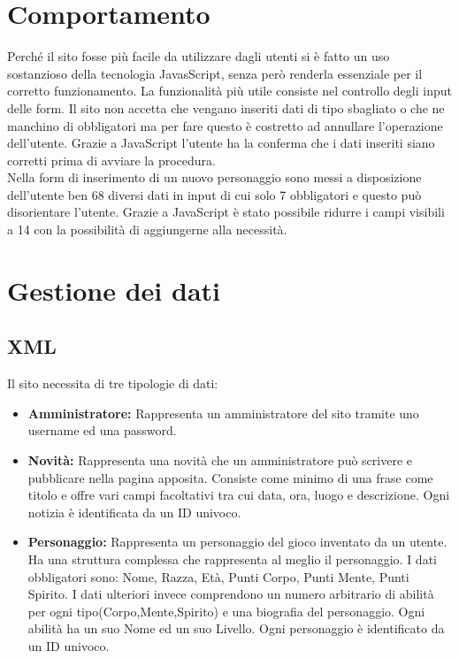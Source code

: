 \documentclass{article}
\begin{document}

\section{Comportamento}
	Perché il sito fosse più facile da utilizzare dagli utenti si è fatto un uso sostanzioso della tecnologia JavasScript, senza
	però renderla essenziale per il corretto funzionamento. La funzionalità più utile consiste nel controllo degli input delle 
	form. Il sito non accetta che vengano inseriti dati di tipo sbagliato o che ne manchino di obbligatori ma per fare questo è 
	costretto ad annullare l'operazione dell'utente. Grazie a JavaScript l'utente ha la conferma che i dati inseriti siano
	corretti prima di avviare la procedura. \\
	Nella form di inserimento di un nuovo personaggio sono messi a disposizione dell'utente ben 68 diversi dati in input di 
	cui solo 7 obbligatori e questo può disorientare l'utente. Grazie a JavaScript è stato possibile ridurre i campi visibili
	a 14 con la possibilità di aggiungerne alla necessità.


\section{Gestione dei dati}
	\subsection{XML}
		Il sito necessita di tre tipologie di dati:
		\begin{itemize}
			\item \textbf{Amministratore: } Rappresenta un amministratore del sito tramite uno username ed una password.
			\item \textbf{Novità: } Rappresenta una novità che un amministratore può scrivere e pubblicare nella pagina apposita.
				Consiste come minimo di una frase come titolo e offre vari campi facoltativi tra cui data, ora, luogo e
				descrizione. Ogni notizia è identificata da un ID univoco.
			\item \textbf{Personaggio: } Rappresenta un personaggio del gioco inventato da un utente. Ha una struttura complessa 
				che rappresenta al meglio il personaggio. I dati obbligatori sono: Nome, Razza, Età, Punti Corpo, Punti Mente, 
				Punti Spirito. I dati ulteriori invece comprendono un numero arbitrario di abilità per ogni 
				tipo(Corpo,Mente,Spirito) e una biografia del personaggio. Ogni abilità ha un suo Nome ed un suo Livello.
				Ogni personaggio è identificato da un ID univoco.
	\end{itemize}
	
\end{document}

